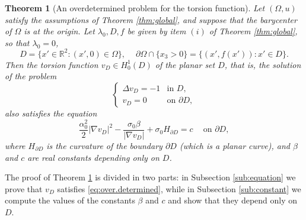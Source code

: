 \documentclass[10pt,reqno,a4paper]{article}
\numberwithin{equation}{section}
\theoremstyle{plain}
\newtheorem{theorem}{Theorem}[section]
\theoremstyle{definition}
\newcommand{\R}{{\mathbb R}}
\newcommand{\lm}{\lambda}
\newcommand{\pa}{\partial}
\begin{document}
\begin{theorem}[An overdetermined problem for the torsion function]
\label{thm:4.1}
Let $(\Omega,u)$ satisfy the assumptions of Theorem \ref{thm:global}, 
and suppose that the barycenter of $\Omega$ is at the origin. 
Let $\lm_0, D, f$ be given by item $(i)$ of Theorem \ref{thm:global}, 
so that $\lm_0 = 0$, 
\begin{equation} \label{eq:omega.is.graph}
D = \{ x' \in \R^2 : (x',0) \in \Omega \}, 
\quad \ 
\pa \Omega \cap \{x_3>0\} = \{(x', f(x')) : x' \in D\}.
\end{equation}
Then the torsion function $v_D \in H^1_0(D)$ of the planar set $D$, 
that is, the solution of the problem 
\begin{equation} \label{eq:torsion} 
\begin{cases}
\Delta v_D = -1 & \text{in } D, \\
v_D=0 & \text{on } \pa D,
\end{cases}
\end{equation}
also satisfies the equation 
\begin{equation} \label{eq:over.determined}
\frac{\alpha_0^2}{2}  | \nabla v_D|^{2}  
- \frac{ \sigma_0 \beta }{ | \nabla v_D| }  
+ \sigma_0 H_{\pa D}
= c 
\quad \ \text{on } \pa D,
\end{equation}
where $H_{\pa D}$ is the curvature of the boundary $\pa D$ (which is a planar curve),
and $\beta$ and $c$ are real constants depending only on $D$.
\end{theorem}

The proof of Theorem \ref{thm:4.1} is divided in two parts: 
in Subsection \ref{sub:equation} we prove that 
$v_D$ satisfies \eqref{eq:over.determined}, 
while in Subsection \ref{sub:constant} we compute the values 
of the constants $\beta$ and $c$ and show that they  
depend only on $D$.
\end{document}
